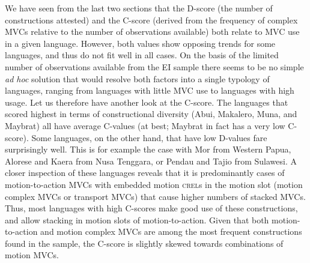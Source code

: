 We have seen from the last two sections that the D-score (the number of constructions attested) and the C-score (derived from the frequency of complex MVCs relative to the number of observations available) both relate to MVC use in a given language. However, both values show opposing trends for some languages, and thus do not fit well in all cases. On the basis of the limited number of observations available from the EI sample there seems to be no simple \textit{ad hoc} solution that would resolve both factors into a single typology of languages, ranging from languages with little MVC use to languages with high usage. Let us therefore have another look at the C-score. The languages that scored highest in terms of constructional diversity (Abui, Makalero, Muna, and Maybrat) all have average C-values (at best; Maybrat in fact has a very low C-score). Some  languages, on the other hand, that have low D-values fare surprisingly well. This is for example the case with Mor from Western Papua, Alorese and Kaera from Nusa Tenggara, or Pendau and Tajio from Sulawesi. A closer inspection of these languages reveals that it is predominantly cases of motion-to-action MVCs with embedded motion \textsc{crel}s in the motion slot (motion complex MVCs or transport MVCs) that cause higher numbers of stacked MVCs. Thus, most languages with high C-scores make good use of these constructions, and allow stacking in motion slots of motion-to-action. Given that both motion-to-action and motion complex MVCs are among the most frequent constructions found in the sample, the C-score is slightly skewed towards combinations of motion MVCs.

